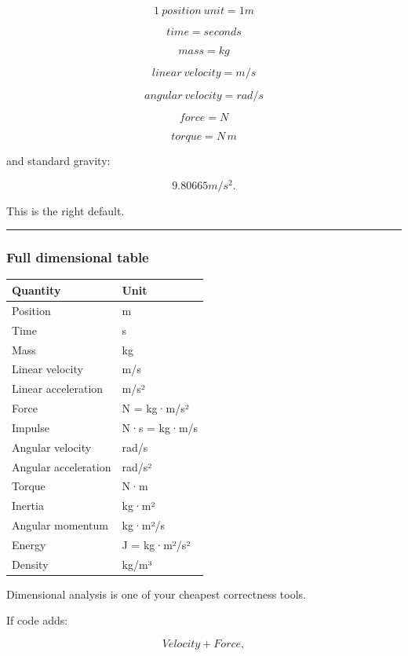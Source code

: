 \[
\boxed{
1\ position\ unit=1m
}
\]

\[
\boxed{
time=seconds
}
\]

\[
\boxed{
mass=kg
}
\]

\[
\boxed{
linear\ velocity=m/s
}
\]

\[
\boxed{
angular\ velocity=rad/s
}
\]

\[
\boxed{
force=N
}
\]

\[
\boxed{
torque=N\,m
}
\]

and standard gravity:

\[
9.80665m/s^2.
\]

This is the right default.

\begin{center}\rule{0.5\linewidth}{0.5pt}\end{center}

\subsubsection{Full dimensional table}\label{full-dimensional-table}

{\def\LTcaptype{none} %
\begin{longtable}[]{@{}ll@{}}
\toprule\noalign{}
Quantity & Unit \\
\midrule\noalign{}
\endhead
\bottomrule\noalign{}
\endlastfoot
Position & m \\
Time & s \\
Mass & kg \\
Linear velocity & m/s \\
Linear acceleration & m/s² \\
Force & N = kg·m/s² \\
Impulse & N·s = kg·m/s \\
Angular velocity & rad/s \\
Angular acceleration & rad/s² \\
Torque & N·m \\
Inertia & kg·m² \\
Angular momentum & kg·m²/s \\
Energy & J = kg·m²/s² \\
Density & kg/m³ \\
\end{longtable}
}

Dimensional analysis is one of your cheapest correctness tools.

If code adds:

\[
Velocity+Force,
\]

